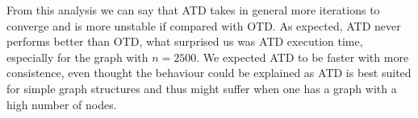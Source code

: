 From this analysis we can say that ATD takes in general more iterations to converge and is more unstable if compared with OTD.
As expected, ATD never performs better than OTD, what surprised us was ATD execution time, especially for the graph with $n=2500$.
We expected ATD to be faster with more consistence, even thought the behaviour could be explained as ATD is best suited for simple graph structures and thus might suffer when one has a graph with a high number of nodes.
